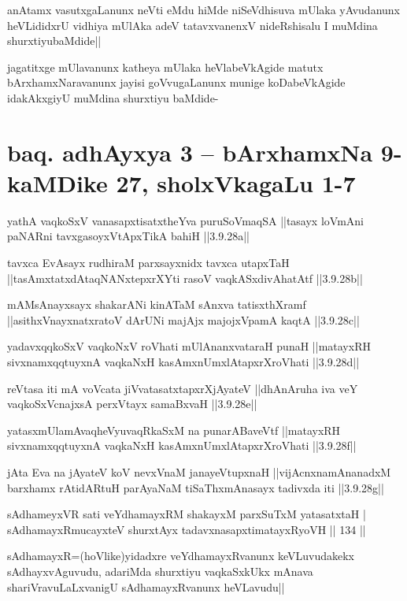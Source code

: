 \begin{artha}%
anAtamx vasutxgaLanunx neVti eMdu hiMde niSeVdhisuva mUlaka yAvudanunx heVLididxrU vidhiya mUlAka adeV tatavxvanenxV nideRshisalu I muMdina shurxtiyubaMdide||

jagatitxge mUlavanunx katheya mUlaka heVlabeVkAgide matutx bArxhamxNaravanunx jayisi goVvugaLanunx munige koDabeVkAgide idakAkxgiyU muMdina shurxtiyu baMdide-
\end{artha}

\section*{baq. adhAyxya 3 -- bArxhamxNa 9-kaMDike 27, sholxVkagaLu 1-7}

\begin{shl}
yathA vaqkoSxV vanasapxtisatxtheYva puruSoV\s maqSA ||tasayx loVmAni paNARni tavxgasoyxVtApxTikA bahiH ||3.9.28a||

tavxca EvAsayx rudhiraM parxsayxnidx tavxca utapxTaH ||tasAmxtatxdAtaqNANxtepxrXYti rasoV vaqkASxdivAhatAtf ||3.9.28b||

mAMsAnayxsayx shakarANi kinATaM sAnxva tatisxthXramf ||asithxVnayxnatxratoV dArUNi majAjx majojxVpamA kaqtA ||3.9.28c||

yadavxqqkoSxV vaqkoNxV roVhati mUlAnanxvataraH punaH ||matayxRH sivxnamxqqtuyxnA vaqkaNxH kasAmxnUmxlAtapxrXroVhati ||3.9.28d||

reVtasa iti mA voVcata jiVvatasatxtapxrXjAyateV ||dhAnAruha iva veY vaqkoSxV\s cnajxsA perxVtayx samaBxvaH ||3.9.28e||

yatasxmUlamAvaqheVyuvaqRkaSxM na punarABaveVtf ||matayxRH sivxnamxqqtuyxnA vaqkaNxH kasAmxnUmxlAtapxrXroVhati ||3.9.28f||

jAta Eva na jAyateV koV nevxVnaM janayeVtupxnaH ||vijAcnxnamAnanadxM barxhamx rAtidARtuH parAyaNaM tiSaThxmAnasayx tadivxda iti ||3.9.28g||
\end{shl}


\begin{shl}
sAdhameyxVR sati veYdhamayxRM shakayxM parxSuTxM yatasatxtaH |\\
sAdhamayxRmucayxteV shurxtAyx tadavxnasapxtimatayxRyoVH \hfill || 134 ||
\end{shl}

\begin{artha}
sAdhamayxR=(hoVlike)yidadxre veYdhamayxRvanunx keVLuvudakekx sAdhayxvAguvudu, adariMda shurxtiyu vaqkaSxkUkx mAnava shariVravuLaLxvanigU sAdhamayxRvanunx heVLavudu||
\end{artha}


